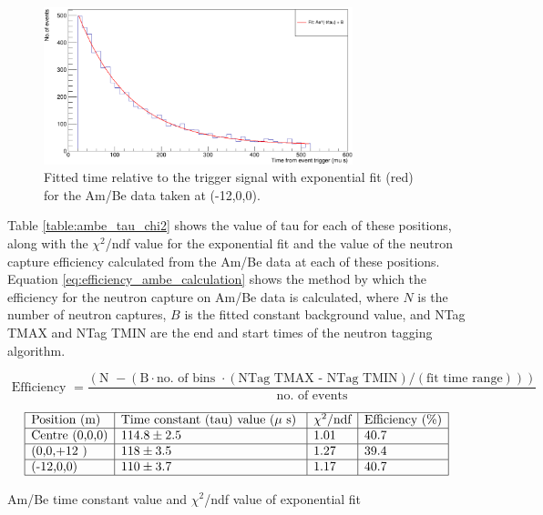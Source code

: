 \begin{figure}
    \centering
    \includegraphics[width=0.8\textwidth]{Figures/ambe_data_-12x.png}
    \caption{Fitted time relative to the trigger signal with exponential fit (red) for the Am/Be data taken at (-12,0,0).}
    \label{fig:ambe_-12}
\end{figure}

Table \ref{table:ambe_tau_chi2} shows the value of tau for each of these positions, along with the $\chi^{2}$/ndf value for the exponential fit and the value of the neutron capture efficiency calculated from the Am/Be data at each of these positions. Equation \ref{eq:efficiency_ambe_calculation} shows the method by which the efficiency for the neutron capture on Am/Be data is calculated, where $N$ is the number of neutron captures, $B$ is the fitted constant background value, and NTag TMAX and NTag TMIN are the end and start times of the neutron tagging algorithm.  





\begin{equation}
    \text { Efficiency }=\frac{(\text {N } - (\text{B} \cdot \text {no. of bins }  \cdot (\text{NTag TMAX - NTag TMIN}) / (\text{fit time range})))  }{\text { no. of events }}
    \label{eq:efficiency_ambe_calculation}
\end{equation}

\begin{table}
    $$
    \begin{array}{|l|l|l|l|l|}
    \hline \text{Position (m)} & \text {Time constant (tau) value ($\mu$ s) } & \text{$\chi^{2}$/ndf} & \text{Efficiency (\%)} \\
    \hline \text{Centre (0,0,0)} & 114.8 \pm 2.5  & 1.01 & 40.7 \\
    \hline \text{(0,0,+12 )} & 118 \pm 3.5 & 1.27 & 39.4 \\
    \hline \text{(-12,0,0)} & 110 \pm 3.7 & 1.17 & 40.7 \\
    \hline
    \end{array}
    $$
    \caption{Am/Be time constant value and $\chi^{2}$/ndf value of exponential fit}
    \label{table:ambe_tau_chi2}
\end{table}

